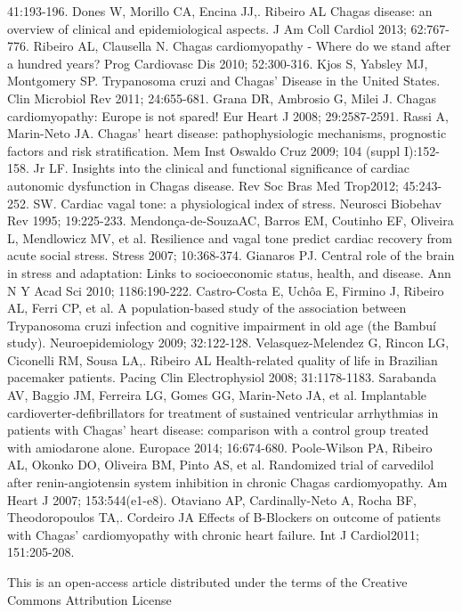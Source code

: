 \begin{biblio}[References]
 41:193-196.
 Dones W, Morillo CA, Encina JJ,. Ribeiro AL Chagas disease: an
 overview of clinical and epidemiological aspects. J Am Coll Cardiol 2013;
 62:767-776.
 Ribeiro AL, Clausella N. Chagas cardiomyopathy - Where do we
 stand after a hundred years? Prog Cardiovasc Dis 2010; 52:300-316.
 Kjos S, Yabsley MJ, Montgomery SP. Trypanosoma cruzi and Chagas'
 Disease in the United States. Clin Microbiol Rev 2011; 24:655-681.
 Grana DR, Ambrosio G, Milei J. Chagas
 cardiomyopathy: Europe is not spared! Eur Heart J 2008;
 29:2587-2591.
 Rassi A, Marin-Neto JA. Chagas' heart disease:
 pathophysiologic mechanisms, prognostic factors and risk stratification. Mem Inst
 Oswaldo Cruz 2009; 104 (suppl I):152-158.
Jr LF. Insights into the clinical and functional significance
 of cardiac autonomic dysfunction in Chagas disease. Rev Soc Bras Med Trop2012;
 45:243-252.
SW. Cardiac vagal tone: a physiological index of stress. Neurosci
 Biobehav Rev 1995; 19:225-233.
 Mendonça-de-SouzaAC, Barros EM, Coutinho EF, Oliveira L,
 Mendlowicz MV, et al. Resilience and vagal tone predict cardiac recovery from acute
 social stress. Stress 2007; 10:368-374.
 Gianaros PJ. Central role of the brain in stress and
 adaptation: Links to socioeconomic status, health, and disease. Ann N Y Acad Sci
 2010; 1186:190-222.
 Castro-Costa E, Uchôa E, Firmino J, Ribeiro AL, Ferri CP,
 et al. A population-based study of the association between Trypanosoma cruzi
 infection and cognitive impairment in old age (the Bambuí study). Neuroepidemiology
 2009; 32:122-128.
 Velasquez-Melendez G, Rincon LG, Ciconelli RM, Sousa LA,.
 Ribeiro AL Health-related quality of life in Brazilian pacemaker patients. Pacing
 Clin Electrophysiol 2008; 31:1178-1183.
 Sarabanda AV, Baggio JM, Ferreira LG, Gomes GG, Marin-Neto JA,
 et al. Implantable cardioverter-defibrillators for treatment of sustained ventricular
 arrhythmias in patients with Chagas' heart disease: comparison with a control group
 treated with amiodarone alone. Europace 2014; 16:674-680.
 Poole-Wilson PA, Ribeiro AL, Okonko DO, Oliveira BM, Pinto
 AS, et al. Randomized trial of carvedilol after renin-angiotensin system inhibition
 in chronic Chagas cardiomyopathy. Am Heart J 2007; 153:544(e1-e8).
 Otaviano AP, Cardinally-Neto A, Rocha BF, Theodoropoulos
 TA,. Cordeiro JA Effects of B-Blockers on outcome of patients with Chagas'
 cardiomyopathy with chronic heart failure. Int J Cardiol2011;
 151:205-208.
\end{biblio}

\medskip\par\noindent
\footnotesize{This is an open-access article distributed under the terms of the Creative
 Commons Attribution License}
